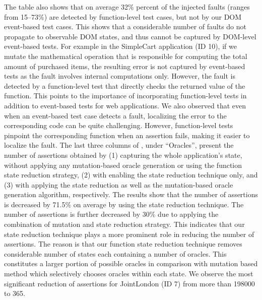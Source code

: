 The table also shows that on average 32\% percent of the injected faults (ranges from 15--73\%) are detected by function-level test cases, but not by our DOM event-based test cases. This shows that a considerable number of faults do not propagate to observable DOM states, and thus cannot be captured by DOM-level event-based tests. 
For example in the SimpleCart application (ID 10), if we mutate the mathematical operation that is responsible for computing the total amount of purchased items, the resulting error is not captured by event-based tests as the fault involves internal computations only. However, the fault is detected by a function-level test that directly checks the returned value of the function.
This points to the importance of incorporating function-level tests in addition to event-based tests for \javascript web applications. We also observed that even when an event-based test case detects a \javascript fault, localizing the error to the corresponding \javascript code can be quite challenging. However, function-level tests pinpoint the  corresponding function when an assertion fails, making it easier to localize the fault. 
The last three columns of , under ``Oracles'', present the number of assertions obtained by (1) capturing the whole application's state,  without applying any mutation-based oracle generation or using the function state reduction strategy, (2) with enabling the state reduction technique only, and (3) with applying the state reduction as well as the mutation-based oracle generation algorithm, respectively. 
The results show that the number of assertions is decreased by 71.5\% on average by using the state reduction technique. The number of assertions is further decreased by 30\% due to applying the combination of mutation and state reduction strategy.
This indicates that our state reduction technique plays a more prominent role in reducing the number of assertions. The reason is that our function state reduction technique removes considerable number of states each containing a number of oracles. This constitutes a larger portion of possible oracles in comparison with mutation based method which selectively chooses oracles within each state. 
We observe the most significant reduction of assertions for JointLondon (ID 7) from more than 198000 to 365. 

